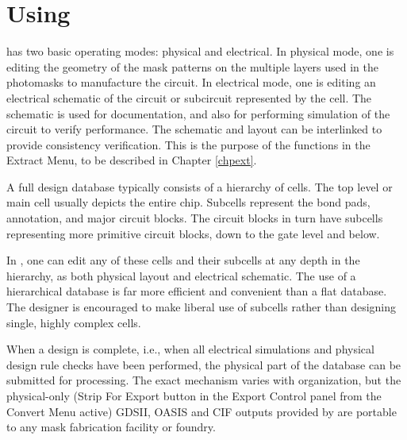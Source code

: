 
\chapter{Using {\Xic}}
{\Xic} has two basic operating modes: physical and electrical.  In
physical mode, one is editing the geometry of the mask patterns on the
multiple layers used in the photomasks to manufacture the circuit.  In
electrical mode, one is editing an electrical schematic of the circuit
or subcircuit represented by the cell.  The schematic is used for
documentation, and also for performing simulation of the circuit to
verify performance.  The schematic and layout can be interlinked to
provide consistency verification.  This is the purpose of the functions
in the {\cb Extract Menu}, to be described in Chapter \ref{chpext}.

A full design database typically consists of a hierarchy of cells. 
The top level or main cell usually depicts the entire chip.  Subcells
represent the bond pads, annotation, and major circuit blocks.  The
circuit blocks in turn have subcells representing more primitive
circuit blocks, down to the gate level and below.

In {\Xic}, one can edit any of these cells and their subcells at any
depth in the hierarchy, as both physical layout and electrical
schematic.  The use of a hierarchical database is far more efficient
and convenient than a flat database.  The designer is encouraged to
make liberal use of subcells rather than designing single, highly
complex cells.

When a design is complete, i.e., when all electrical simulations and
physical design rule checks have been performed, the physical part of
the database can be submitted for processing.  The exact mechanism
varies with organization, but the physical-only ({\cb Strip For
Export} button in the {\cb Export Control} panel from the {\cb
Convert Menu} active) GDSII, OASIS and CIF outputs provided by {\Xic}
are portable to any mask fabrication facility or foundry.

